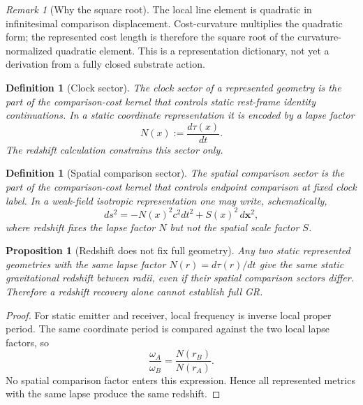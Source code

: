 \documentclass[11pt]{article}
\newtheorem{proposition}[theorem]{Proposition}
\newtheorem{definition}[theorem]{Definition}
\theoremstyle{remark}
\newtheorem{remark}[theorem]{Remark}
\begin{document}
\begin{remark}[Why the square root]
The local line element is quadratic in infinitesimal comparison displacement.  Cost-curvature multiplies the quadratic form; the represented cost length is therefore the square root of the curvature-normalized quadratic element.  This is a representation dictionary, not yet a derivation from a fully closed substrate action.
\end{remark}

\begin{definition}[Clock sector]
The \emph{clock sector} of a represented geometry is the part of the comparison-cost kernel that controls static rest-frame identity continuations.  In a static coordinate representation it is encoded by a lapse factor
\[
        N(x):=\frac{d\tau(x)}{dt}.
\]
The redshift calculation constrains this sector only.
\end{definition}

\begin{definition}[Spatial comparison sector]
The \emph{spatial comparison sector} is the part of the comparison-cost kernel that controls endpoint comparison at fixed clock label.  In a weak-field isotropic representation one may write, schematically,
\[
        ds^2=-N(x)^2c^2dt^2 + S(x)^2\,d\mathbf x^2,
\]
where redshift fixes the lapse factor \(N\) but not the spatial scale factor \(S\).
\end{definition}

\begin{proposition}[Redshift does not fix full geometry]
\label{prop:redshift-not-full-geometry}
Any two static represented geometries with the same lapse factor \(N(r)=d\tau(r)/dt\) give the same static gravitational redshift between radii, even if their spatial comparison sectors differ.  Therefore a redshift recovery alone cannot establish full GR.
\end{proposition}

\begin{proof}
For static emitter and receiver, local frequency is inverse local proper period.  The same coordinate period is compared against the two local lapse factors, so
\[
        \frac{\omega_A}{\omega_B}=\frac{N(r_B)}{N(r_A)}.
\]
No spatial comparison factor enters this expression.  Hence all represented metrics with the same lapse produce the same redshift.
\end{proof}
\end{document}
